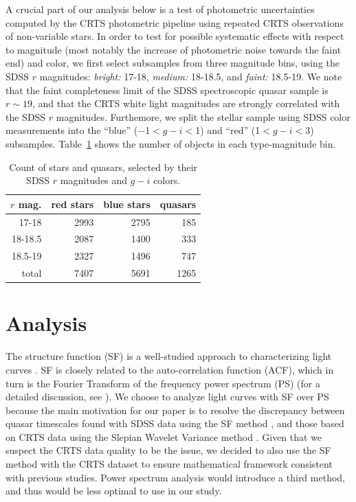 \documentclass[fleqn,usenatbib]{mnras}
\begin{document}
A crucial part of our analysis below is a test of photometric uncertainties computed by the CRTS photometric
pipeline using repeated CRTS observations of non-variable stars. In order to test for possible systematic
effects with respect to magnitude (most notably the increase of photometric noise towards
the faint end) and color, we first select  subsamples from three magnitude bins, using the SDSS $r$ magnitudes: 
{\it bright:} 17-18,  {\it medium:} 18-18.5, and {\it faint:} 18.5-19. We note that the faint completeness limit 
of the SDSS spectroscopic quasar sample is $r\sim19$, and that the CRTS white light magnitudes are strongly
correlated with the SDSS $r$ magnitudes. Furthemore, we split the stellar sample using SDSS color measurements
into the ``blue'' ($-$1$<g-i<$1) and ``red'' (1$<g-i<$3) subsamples. Table~\ref{tab:object_count} shows the 
number of objects in each type-magnitude bin.  

\begin{table}
\centering
\caption{Count of stars and quasars, selected by their SDSS $r$ magnitudes and $g-i$ colors.}
\label{tab:object_count}
\begin{tabular}{ r|rrr } 
\hline
$r$ mag.  & red stars & blue stars & quasars \\ 
\hline
17-18   & 2993 & 2795   & 185    \\ 
18-18.5 & 2087 &  1400  & 333   \\ 
18.5-19 & 2327 &  1496  & 747   \\
\hline
total       & 7407 &  5691 & 1265 
\end{tabular}
\end{table}
 


\section{Analysis}
\label{sec:analysis}

The structure function (SF) is a well-studied approach to characterizing light curves \citep{2004Ivezic, berk2004, devries2005, macleod2010, graham2013, kozlowski2016}. SF is closely related to the auto-correlation function (ACF), which in turn is the Fourier Transform of the  frequency power spectrum (PS) (for a detailed discussion,  see \citealt{ivezic2014,kozlowski2016}). We choose to analyze light curves with SF over PS because the main motivation for our paper is to resolve the discrepancy between quasar timescales  found with SDSS data using the SF method \citep{macleod2010, macleod2011, macleod2012}, and those based on CRTS data using the Slepian Wavelet Variance method \citep{graham2014}.  Given that we suspect the CRTS data quality to be the issue, we decided to also use the SF method with the CRTS dataset to ensure mathematical framework consistent with previous studies. Power spectrum analysis would introduce a third method, and thus would be less optimal to use in our study.  
\end{document}
